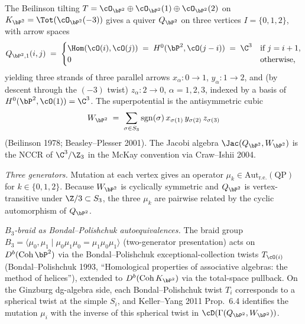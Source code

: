 \begin{example}
\label{ex:local-p2-mutations}
The Beilinson tilting
$T = \cO_{\bP^2} \oplus \cO_{\bP^2}(1) \oplus \cO_{\bP^2}(2)$ on
$K_{\bP^2} = \Tot(\cO_{\bP^2}(-3))$ gives a quiver $Q_{\bP^2}$ on three
vertices $I = \{0, 1, 2\}$, with arrow spaces
\[
 Q_{\bP^2, 1}(i, j) \;=\;
 \begin{cases}
 \Hom(\cO(i), \cO(j)) \;=\; H^{0}(\bP^2, \cO(j - i)) \;=\; \C^{3} &
 \text{if } j = i + 1, \\
 0 & \text{otherwise,}
 \end{cases}
\]
yielding three strands of three parallel arrows $x_\alpha \colon 0 \to 1$,
$y_\alpha \colon 1 \to 2$, and (by descent through the $(-3)$ twist)
$z_\alpha \colon 2 \to 0$, $\alpha = 1, 2, 3$, indexed by a basis of
$H^0(\bP^2, \cO(1)) = \C^3$. The superpotential is the antisymmetric cubic
\[
 W_{\bP^2} \;=\; \sum_{\sigma \in S_3} \mathrm{sgn}(\sigma)\,
 x_{\sigma(1)}\, y_{\sigma(2)}\, z_{\sigma(3)}
\]
(Beilinson 1978; Beasley--Plesser 2001). The Jacobi algebra
$\Jac(Q_{\bP^2}, W_{\bP^2})$ is the NCCR of $\C^3/\Z_3$ in the McKay
convention via Craw--Ishii 2004.

\emph{Three generators.} Mutation at each vertex gives an operator
$\mu_k \in \mathrm{Aut}_{\mathrm{r.e.}}(\text{QP})$ for $k \in \{0, 1, 2\}$.
Because $W_{\bP^2}$ is cyclically symmetric and $Q_{\bP^2}$ is
vertex-transitive under $\Z/3 \subset S_3$, the three $\mu_k$ are pairwise
related by the cyclic automorphism of $Q_{\bP^2}$.

\emph{$B_3$-braid as Bondal--Polishchuk autoequivalences.} The braid group
$B_3 = \langle \mu_0, \mu_1 \mid \mu_0 \mu_1 \mu_0 = \mu_1 \mu_0 \mu_1 \rangle$
(two-generator presentation) acts on $D^b(\mathrm{Coh}\, \bP^2)$ via the
Bondal--Polishchuk exceptional-collection twists $T_{\cO(i)}$
(Bondal--Polishchuk 1993, ``Homological properties of associative algebras:
the method of helices''), extended to $D^b(\mathrm{Coh}\, K_{\bP^2})$ via the
total-space pullback. On the Ginzburg dg-algebra side, each Bondal--Polishchuk
twist $T_i$ corresponds to a spherical twist at the simple $S_i$, and
Keller--Yang 2011 Prop.~6.4 identifies the mutation $\mu_i$ with the inverse
of this spherical twist in $\cD(\Gamma(Q_{\bP^2}, W_{\bP^2}))$.


\end{example}
